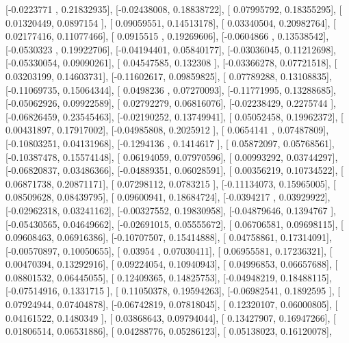 \documentclass{article}
\begin{document}
       [-0.0223771 ,  0.21832935],
       [-0.02438008,  0.18838722],
       [ 0.07995792,  0.18355295],
       [ 0.01320449,  0.0897154 ],
       [ 0.09059551,  0.14513178],
       [ 0.03340504,  0.20982764],
       [ 0.02177416,  0.11077466],
       [ 0.0915515 ,  0.19269606],
       [-0.0604866 ,  0.13538542],
       [-0.0530323 ,  0.19922706],
       [-0.04194401,  0.05840177],
       [-0.03036045,  0.11212698],
       [-0.05330054,  0.09090261],
       [ 0.04547585,  0.132308  ],
       [-0.03366278,  0.07721518],
       [ 0.03203199,  0.14603731],
       [-0.11602617,  0.09859825],
       [ 0.07789288,  0.13108835],
       [-0.11069735,  0.15064344],
       [ 0.0498236 ,  0.07270093],
       [-0.11771995,  0.13288685],
       [-0.05062926,  0.09922589],
       [ 0.02792279,  0.06816076],
       [-0.02238429,  0.2275744 ],
       [-0.06826459,  0.23545463],
       [-0.02190252,  0.13749941],
       [ 0.05052458,  0.19962372],
       [ 0.00431897,  0.17917002],
       [-0.04985808,  0.2025912 ],
       [ 0.0654141 ,  0.07487809],
       [-0.10803251,  0.04131968],
       [-0.1294136 ,  0.1414617 ],
       [ 0.05872097,  0.05768561],
       [-0.10387478,  0.15574148],
       [ 0.06194059,  0.07970596],
       [ 0.00993292,  0.03744297],
       [-0.06820837,  0.03486366],
       [-0.04889351,  0.06028591],
       [ 0.00356219,  0.10734522],
       [ 0.06871738,  0.20871171],
       [ 0.07298112,  0.0783215 ],
       [-0.11134073,  0.15965005],
       [ 0.08509628,  0.08439795],
       [ 0.09600941,  0.18684724],
       [-0.0394217 ,  0.03929922],
       [-0.02962318,  0.03241162],
       [-0.00327552,  0.19830958],
       [-0.04879646,  0.1394767 ],
       [-0.05430565,  0.04649662],
       [-0.02691015,  0.05555672],
       [ 0.06706581,  0.09698115],
       [ 0.09608463,  0.06916386],
       [-0.10707507,  0.15414888],
       [ 0.04758861,  0.17314091],
       [-0.00570897,  0.10050655],
       [ 0.03954   ,  0.07030411],
       [ 0.06955581,  0.17236321],
       [ 0.00470394,  0.13292916],
       [ 0.09224054,  0.10940943],
       [ 0.04996853,  0.06657688],
       [ 0.08801532,  0.06445055],
       [ 0.12409365,  0.14825753],
       [-0.04948219,  0.18488115],
       [-0.07514916,  0.1331715 ],
       [ 0.11050378,  0.19594263],
       [-0.06982541,  0.1892595 ],
       [ 0.07924944,  0.07404878],
       [-0.06742819,  0.07818045],
       [ 0.12320107,  0.06000805],
       [ 0.04161522,  0.1480349 ],
       [ 0.03868643,  0.09794044],
       [ 0.13427907,  0.16947266],
       [ 0.01806514,  0.06531886],
       [ 0.04288776,  0.05286123],
       [ 0.05138023,  0.16120078],
\end{document}

